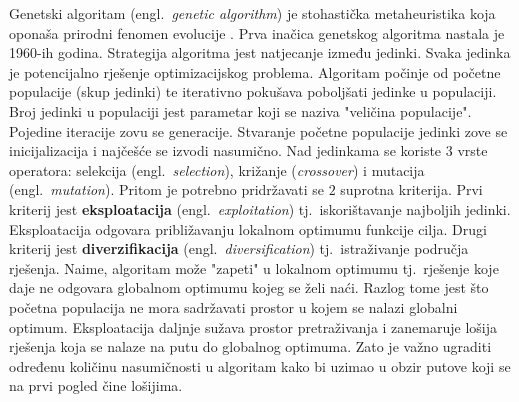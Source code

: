 \documentclass[times, utf8, diplomski]{fer}
\begin{document}
Genetski algoritam (engl.~\textit{genetic algorithm}) je stohastička metaheuristika koja oponaša prirodni fenomen evolucije \cite{book:evolution}. Prva inačica genetskog algoritma nastala je 1960-ih godina. Strategija algoritma jest natjecanje između jedinki. Svaka jedinka je potencijalno rješenje optimizacijskog problema. Algoritam počinje od početne populacije (skup jedinki) te iterativno pokušava poboljšati jedinke u populaciji. Broj jedinki u populaciji jest parametar koji se naziva "veličina populacije". Pojedine iteracije zovu se generacije. Stvaranje početne populacije jedinki zove se inicijalizacija i najčešće se izvodi nasumično. Nad jedinkama se koriste $3$ vrste operatora: selekcija (engl.~\textit{selection}), križanje (\textit{crossover}) i mutacija (engl.~\textit{mutation}). Pritom je potrebno pridržavati se $2$ suprotna kriterija. Prvi kriterij jest \textbf{eksploatacija} (engl.~\textit{exploitation}) tj.~iskorištavanje najboljih jedinki. Eksploatacija odgovara približavanju lokalnom optimumu funkcije cilja. Drugi kriterij jest \textbf{diverzifikacija} (engl.~\textit{diversification}) tj.~istraživanje područja rješenja. Naime, algoritam može "zapeti" u lokalnom optimumu tj.~rješenje koje daje ne odgovara globalnom optimumu kojeg se želi naći. Razlog tome jest što početna populacija ne mora sadržavati prostor u kojem se nalazi globalni optimum. Eksploatacija daljnje sužava prostor pretraživanja i zanemaruje lošija rješenja koja se nalaze na putu do globalnog optimuma. Zato je važno ugraditi određenu količinu nasumičnosti u algoritam kako bi uzimao u obzir putove koji se na prvi pogled čine lošijima.
\end{document}
